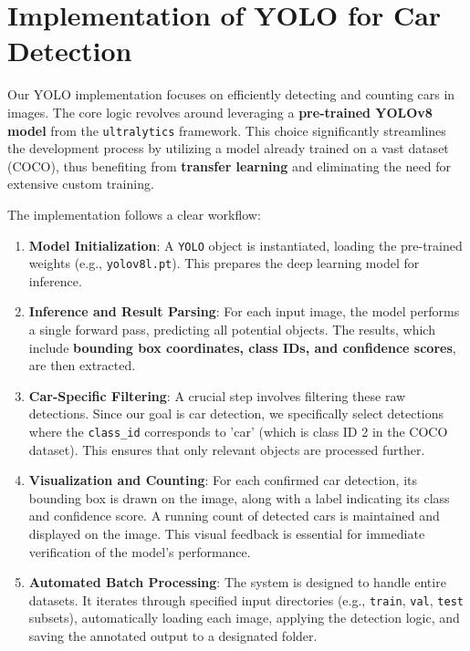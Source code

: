 \documentclass[12pt,a4paper]{article}
\begin{document}
\section{Implementation of YOLO for Car Detection}
\label{sec:yolo_implementation}

Our YOLO implementation focuses on efficiently detecting and counting cars in images. The core logic revolves around leveraging a \textbf{pre-trained YOLOv8 model} from the \texttt{ultralytics} framework. This choice significantly streamlines the development process by utilizing a model already trained on a vast dataset (COCO), thus benefiting from \textbf{transfer learning} and eliminating the need for extensive custom training.

The implementation follows a clear workflow:

\begin{enumerate}
    \item \textbf{Model Initialization}: A \texttt{YOLO} object is instantiated, loading the pre-trained weights (e.g., \texttt{yolov8l.pt}). This prepares the deep learning model for inference.
    \item \textbf{Inference and Result Parsing}: For each input image, the model performs a single forward pass, predicting all potential objects. The results, which include \textbf{bounding box coordinates, class IDs, and confidence scores}, are then extracted.
    \item \textbf{Car-Specific Filtering}: A crucial step involves filtering these raw detections. Since our goal is car detection, we specifically select detections where the \texttt{class\_id} corresponds to 'car' (which is class ID 2 in the COCO dataset). This ensures that only relevant objects are processed further.
    \item \textbf{Visualization and Counting}: For each confirmed car detection, its bounding box is drawn on the image, along with a label indicating its class and confidence score. A running count of detected cars is maintained and displayed on the image. This visual feedback is essential for immediate verification of the model's performance.
    \item \textbf{Automated Batch Processing}: The system is designed to handle entire datasets. It iterates through specified input directories (e.g., \texttt{train}, \texttt{val}, \texttt{test} subsets), automatically loading each image, applying the detection logic, and saving the annotated output to a designated folder.
\end{enumerate}
\end{document}
